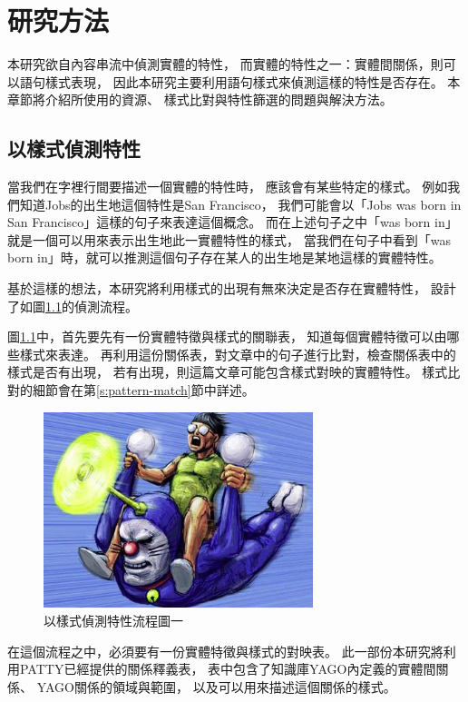%
%
%
\chapter{研究方法}
\label{c:method}

本研究欲自內容串流中偵測實體的特性，
而實體的特性之一：實體間關係，則可以語句樣式表現，
因此本研究主要利用語句樣式來偵測這樣的特性是否存在。
本章節將介紹所使用的資源、
樣式比對與特性篩選的問題與解決方法。

\section{以樣式偵測特性}
當我們在字裡行間要描述一個實體的特性時，
應該會有某些特定的樣式。
例如我們知道Jobs的出生地這個特性是San Francisco，
我們可能會以「Jobs was born in San Francisco」這樣的句子來表達這個概念。
而在上述句子之中「was born in」就是一個可以用來表示出生地此一實體特性的樣式，
當我們在句子中看到「was born in」時，就可以推測這個句子存在某人的出生地是某地這樣的實體特性。

基於這樣的想法，本研究將利用樣式的出現有無來決定是否存在實體特性，
設計了如圖\ref{i:process-v1}的偵測流程。

圖\ref{i:process-v1}中，首先要先有一份實體特徵與樣式的關聯表，
知道每個實體特徵可以由哪些樣式來表達。
再利用這份關係表，對文章中的句子進行比對，檢查關係表中的樣式是否有出現，
若有出現，則這篇文章可能包含樣式對映的實體特性。
樣式比對的細節會在第\ref{s:pattern-match}節中詳述。

\begin{figure}
    \centering
    \includegraphics[width=0.7\textwidth]{images/00-tmp-img}    %
    \caption{以樣式偵測特性流程圖一}
    \label{i:process-v1}
\end{figure}

在這個流程之中，必須要有一份實體特徵與樣式的對映表。
此一部份本研究將利用PATTY已經提供的關係釋義表，
表中包含了知識庫YAGO內定義的實體間關係、
YAGO關係的領域與範圍，
以及可以用來描述這個關係的樣式。

